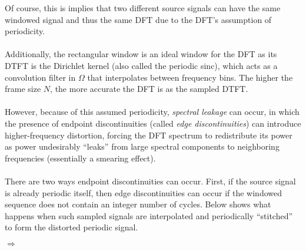\documentclass{report}
\begin{document}
Of course, this is implies that two different source signals can have the same windowed signal and thus 
the same DFT due to the DFT's assumption of periodicity.
\\ \\
Additionally, the rectangular window is an ideal window for the DFT as its DTFT is the Dirichlet kernel (also called the periodic sinc), 
which acts as a convolution filter in $\Omega$ that interpolates between frequency bins. The higher the frame size $N$, the more 
accurate the DFT is as the sampled DTFT.
\\ \\
However, because of this assumed periodicity, \emph{spectral leakage} can occur, in which the presence of endpoint discontinuities (called \emph{edge discontinuities}) can introduce 
higher-frequency distortion, forcing the DFT spectrum to redistribute its power as power undesirably ``leaks'' from large spectral components to neighboring 
frequencies (essentially a smearing effect). 
\\ \\
There are two ways endpoint discontinuities can occur. First, if the source signal is already periodic itself, then edge discontinuities can occur if the windowed sequence does not contain 
an integer number of cycles. Below shows what happens when such sampled signals are interpolated and periodically ``stitched'' to form the distorted periodic signal.
\begin{center}
     $\Longrightarrow$
\end{center}
\end{document}
